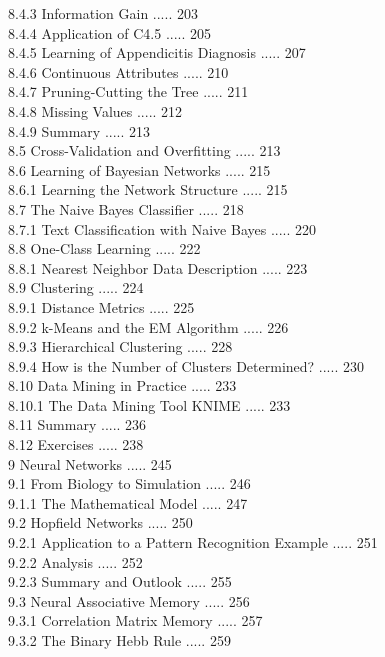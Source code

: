 \documentclass[10pt]{article}
\begin{document}
8.4.3 Information Gain ..... 203\\
8.4.4 Application of C4.5 ..... 205\\
8.4.5 Learning of Appendicitis Diagnosis ..... 207\\
8.4.6 Continuous Attributes ..... 210\\
8.4.7 Pruning-Cutting the Tree ..... 211\\
8.4.8 Missing Values ..... 212\\
8.4.9 Summary ..... 213\\
8.5 Cross-Validation and Overfitting ..... 213\\
8.6 Learning of Bayesian Networks ..... 215\\
8.6.1 Learning the Network Structure ..... 215\\
8.7 The Naive Bayes Classifier ..... 218\\
8.7.1 Text Classification with Naive Bayes ..... 220\\
8.8 One-Class Learning ..... 222\\
8.8.1 Nearest Neighbor Data Description ..... 223\\
8.9 Clustering ..... 224\\
8.9.1 Distance Metrics ..... 225\\
8.9.2 k-Means and the EM Algorithm ..... 226\\
8.9.3 Hierarchical Clustering ..... 228\\
8.9.4 How is the Number of Clusters Determined? ..... 230\\
8.10 Data Mining in Practice ..... 233\\
8.10.1 The Data Mining Tool KNIME ..... 233\\
8.11 Summary ..... 236\\
8.12 Exercises ..... 238\\
9 Neural Networks ..... 245\\
9.1 From Biology to Simulation ..... 246\\
9.1.1 The Mathematical Model ..... 247\\
9.2 Hopfield Networks ..... 250\\
9.2.1 Application to a Pattern Recognition Example ..... 251\\
9.2.2 Analysis ..... 252\\
9.2.3 Summary and Outlook ..... 255\\
9.3 Neural Associative Memory ..... 256\\
9.3.1 Correlation Matrix Memory ..... 257\\
9.3.2 The Binary Hebb Rule ..... 259\\
\end{document}
